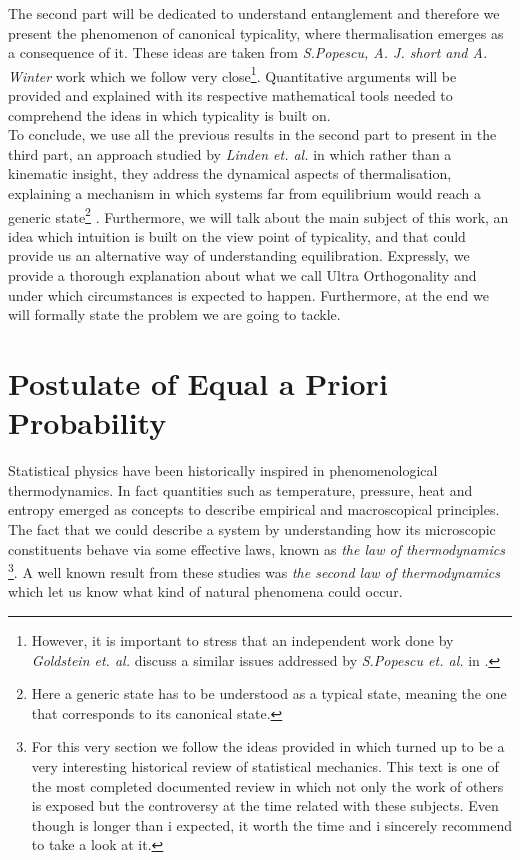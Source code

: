 \indent The second part will be dedicated to understand entanglement and therefore we present the phenomenon of canonical typicality, where thermalisation emerges as a consequence of it. These ideas are taken from  \textit{S.Popescu, A. J. short and A. Winter} \cite{popescu_entanglement_2006, popescu_foundations_2005} work which we follow very close\footnote{However, it is important to stress that an independent work done by \textit{Goldstein et. al.} \cite{goldstein_canonical_2006} discuss a similar issues addressed by  \textit{S.Popescu et. al.} in \cite{popescu_entanglement_2006, popescu_foundations_2005}.}. Quantitative arguments will be provided and explained with its respective mathematical tools needed to comprehend the ideas in which typicality is built on.\\

\indent To conclude, we use all the previous results in the second part to present in the third part, an approach studied by \textit{Linden et. al.} \cite{linden_quantum_2009} in which rather than a kinematic insight, they address the dynamical aspects of thermalisation, explaining a mechanism in which systems far from equilibrium would reach a generic state\footnote{Here a generic state has to be understood as a typical state, meaning the one that corresponds to its canonical state.} \cite{linden_quantum_2009}. Furthermore, we will talk about the main subject of this work, an idea which intuition is built on the view point of typicality, and that could provide us an alternative way of understanding equilibration. Expressly, we provide a thorough explanation about what we call Ultra Orthogonality and under which circumstances is expected to happen. Furthermore,  at the end we will formally state the problem we are going to tackle. 

\section{Postulate of Equal a Priori Probability}
Statistical physics have been historically inspired in phenomenological thermodynamics. In fact quantities such as temperature, pressure, heat and entropy emerged as concepts to describe empirical and macroscopical principles. The fact that we could describe a system by understanding how its microscopic constituents behave via some effective laws, known as \textit{the law of thermodynamics} \cite{uffink_handbook_2007}\footnote{For this very section we follow the ideas provided in \cite{uffink_handbook_2007} which turned up to be a very interesting historical review of statistical mechanics. This text is one of the most completed documented review in which not only the work of others is exposed but the controversy at the time related with these subjects. Even though is longer than i expected, it worth the time and i sincerely recommend to take a look at it.}. A well known result from these studies was \textit{the second law of thermodynamics} which let us know what kind of natural phenomena could occur.\\

